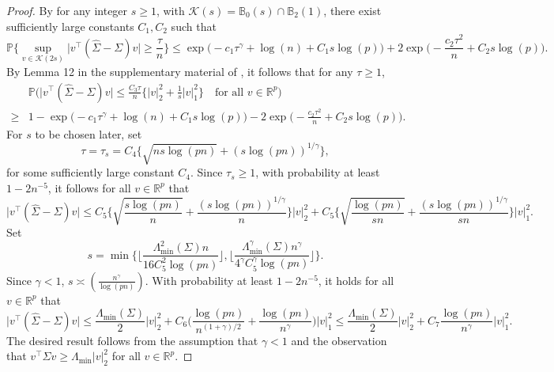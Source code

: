 \documentclass[11pt]{article}
\newcommand{\p}{\mathbb P}
\theoremstyle{plain}
\theoremstyle{definition}
\begin{document}
 
\begin{proof}  
 
By 
   for any integer $s\ge 1$, with $\mathcal K(s) =\mathbb  B_0(s) \cap \mathbb B_2(1) $, there exist  sufficiently large constants
    $C_1, C_2$ such that  
$$ \p\bigg\{  \sup_{v \in \mathcal K(2s) } \bigg| v^\top (\widehat \Sigma - \Sigma ) v\bigg| \ge   \frac{ \tau}{n }  \bigg\} 
\le    \exp\Big(-c_1  \tau ^{\gamma} +\log(n)+C _1s\log(p) \Big) + 2 \exp\Big(-\frac{c_2 \tau ^2}{ n   }  +C_2 s\log(p)  \Big) .
$$ 
  By Lemma 12 in the  supplementary material  of   \cite{loh2012high}, it follows that  
  for any $\tau\ge 1$,
\begin{align*}
  &\p \bigg (   \big | v^\top  (\widehat \Sigma -\Sigma )v\big | \le   \frac{ C_3\tau}{n }   \big  \{   |v  |_2^2 + \frac{1}{s}  |v  |_1^2 \big \}  \quad \text{for all } v \in \mathbb R^p  \bigg)\\
  \ge& 1 - \exp\Big(-c_1  \tau ^{\gamma} +\log(n)+C _1s\log(p) \Big) - 2 \exp\Big(-\frac{c_2 \tau ^2}{ n   }  +C_2 s\log(p)  \Big)   .
 \end{align*}
For $s $  to be chosen later, set
$$\tau = \tau_s  = C_4\bigg\{  \sqrt { n s   \log(pn)    }  +     ( s \log(pn ) )^{1/\gamma }  \bigg \}     ,$$ for some sufficiently large constant  $C_4$. 
Since $ \tau_s\ge 1$, 
with probability at least $ 1-2n^{-5}$, it follows for all $v \in \mathbb R^p$ that
$$     \big | v^\top  (\widehat \Sigma -\Sigma )v\big | \le   C_5  \bigg  \{  \sqrt { \frac{ s\log(pn)   }{n } }    +   \frac{  ( s \log(pn ) )^{1/\gamma } }{ n }\bigg \}  |v  |_2^2   +  C_5 \bigg\{ \sqrt { \frac{  \log(pn)   }{s n } }   + \frac{  ( s \log(pn ) )^{1/\gamma } }{ sn } \bigg \}  |v  |_1^2.$$
Set   
$$s =  \min \bigg\{ \bigg\lfloor \frac {  \Lambda_{\min}^2 (\Sigma) n}{ 16 C_5^2\log(pn)}  \bigg \rfloor  , \bigg\lfloor \frac {  \Lambda_{\min}^\gamma  (\Sigma) n^\gamma }{ 4^\gamma C_5^\gamma   \log(pn)}  \bigg \rfloor   \bigg \}  . $$  
Since $ \gamma<1$, $ s\asymp ( \frac{ n^\gamma}{ \log(pn) })$.
With probability at least 
 $ 1-2  n^{-5}  $, it holds for all $v \in \mathbb R^p$ that 
$$  \bigg| v^\top  (\widehat \Sigma -\Sigma )v\bigg| \le \frac{\Lambda_{\min } (\Sigma )}{2   }     |v |_2^2 + C_6  \bigg( \frac{\log(pn)}{n^{(1+\gamma)/2} } + \frac{\log(pn) }{n^\gamma }\bigg)   |v  |_1^2  \le \frac{\Lambda_{\min } (\Sigma )}{2   }     |v |_2^2 + C_7    \frac{\log(pn) }{n^\gamma }    |v  |_1^2  . $$ 
The desired result follows from the assumption that $\gamma<1  $ and the observation that 
$ v^\top \Sigma v \ge \Lambda_{\min } |v|_2^2  $ for all $v\in \mathbb R^p$.
\end{proof} 
\end{document}
